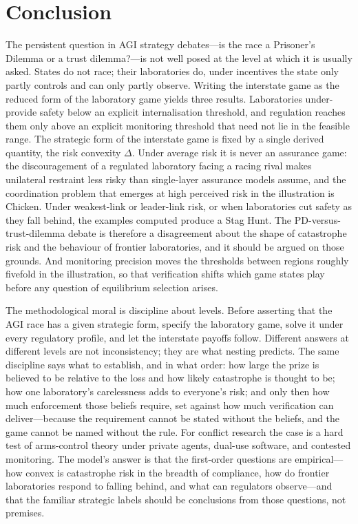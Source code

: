 \documentclass[11pt]{article}
\theoremstyle{plain}
\theoremstyle{definition}
\theoremstyle{remark}
\newcommand{\Delt}{\Delta}
\begin{document}
\section{Conclusion}

The persistent question in AGI strategy debates---is the race a Prisoner's Dilemma or a trust dilemma?---is not well posed at the level at which it is usually asked. States do not race; their laboratories do, under incentives the state only partly controls and can only partly observe. Writing the interstate game as the reduced form of the laboratory game yields three results. Laboratories under-provide safety below an explicit internalisation threshold, and regulation reaches them only above an explicit monitoring threshold that need not lie in the feasible range. The strategic form of the interstate game is fixed by a single derived quantity, the risk convexity $\Delt$. Under average risk it is never an assurance game: the discouragement of a regulated laboratory facing a racing rival makes unilateral restraint less risky than single-layer assurance models assume, and the coordination problem that emerges at high perceived risk in the illustration is Chicken. Under weakest-link or leader-link risk, or when laboratories cut safety as they fall behind, the examples computed produce a Stag Hunt. The PD-versus-trust-dilemma debate is therefore a disagreement about the shape of catastrophe risk and the behaviour of frontier laboratories, and it should be argued on those grounds. And monitoring precision moves the thresholds between regions roughly fivefold in the illustration, so that verification shifts which game states play before any question of equilibrium selection arises.

The methodological moral is discipline about levels. Before asserting that the AGI race has a given strategic form, specify the laboratory game, solve it under every regulatory profile, and let the interstate payoffs follow. Different answers at different levels are not inconsistency; they are what nesting predicts. The same discipline says what to establish, and in what order: how large the prize is believed to be relative to the loss and how likely catastrophe is thought to be; how one laboratory's carelessness adds to everyone's risk; and only then how much enforcement those beliefs require, set against how much verification can deliver---because the requirement cannot be stated without the beliefs, and the game cannot be named without the rule. For conflict research the case is a hard test of arms-control theory under private agents, dual-use software, and contested monitoring. The model's answer is that the first-order questions are empirical---how convex is catastrophe risk in the breadth of compliance, how do frontier laboratories respond to falling behind, and what can regulators observe---and that the familiar strategic labels should be conclusions from those questions, not premises.
\end{document}

